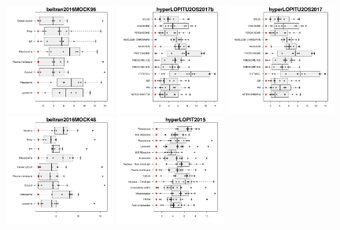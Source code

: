 \documentclass[12pt]{article}\usepackage[]{graphicx}\usepackage[]{color}
\begin{document}
\begin{appendices}
\begin{figure}[htb]
  \centering
  \includegraphics[width = 0.32\textwidth]{./figure/allqseps-1.pdf}
  \includegraphics[width = 0.32\textwidth]{./figure/allqseps-2.pdf}
  \includegraphics[width = 0.32\textwidth]{./figure/allqseps-3.pdf}
  \includegraphics[width = 0.32\textwidth]{./figure/allqseps-4.pdf}
  \includegraphics[width = 0.32\textwidth]{./figure/allqseps-5.pdf}

\end{figure}
\end{appendices}
\end{document}
